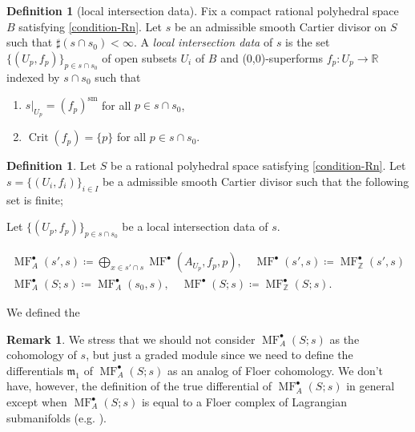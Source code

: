 \documentclass[a4paper,dvipdfmx,reqno,12pt]{amsart}
\theoremstyle{definition}
\newtheorem{definition}[theorem]{Definition}
\newtheorem{remark}[theorem]{Remark}
\newcommand{\deq}{\coloneqq}
\newcommand{\opn}[1]{\operatorname{#1}}
\numberwithin{equation}{section}
\begin{document}
\begin{definition}[{local intersection data}]
Fix a compact rational polyhedral space $B$ satisfying 
\cref{condition-Rn}.
Let $s$ be an admissible smooth Cartier divisor 
on $S$ such that $\sharp (s\cap s_0)<\infty$. 
A \emph{local intersection data} of $s$ is the set 
$\{(U_p,f_p)\}_{p\in s\cap s_0}$ of open subsets
$U_i$ of $B$ and (0,0)-superforms
$f_p\colon U_p \to \mathbb{R}$ indexed by 
$ s\cap s_0$ 
such that
\begin{enumerate}
\item $s|_{U_p}=(f_p)^{\mathrm{sm}}$
for all $p\in s\cap s_0$,
\item $\opn{Crit}(f_p)=\{p\}$ for all $p\in s\cap s_0$.
\end{enumerate}
\end{definition}


\begin{definition}
Let $S$ be a rational polyhedral space 
satisfying \cref{condition-Rn}.
Let $s=\{(U_i,f_i)\}_{i\in I}$ be a admissible smooth Cartier divisor such that
the following set is finite;


Let $\{(U_p,f_p)\}_{p\in s\cap s_0}$ 
be a local intersection data of $s$.

\begin{align}
\opn{MF}^{\bullet}_{A}(s',s)\deq 
\bigoplus_{x\in s' \cap s} 
\opn{MF}^{\bullet}(A_{U_p},f_{p},p), \quad 
\opn{MF}^{\bullet}(s',s)
\deq \opn{MF}^{\bullet}_{\mathbb{Z}}(s',s)\\
\opn{MF}^{\bullet}_A(S;s)
\deq \opn{MF}^{\bullet}_{A}(s_0,s), \quad
\opn{MF}^{\bullet}(S;s)\deq
\opn{MF}^{\bullet}_{\mathbb{Z}}(S;s).
\end{align}
\end{definition}

We defined the 

\begin{remark}
\label{remark-differential-graded-module}
We stress that we should not consider 
$\opn{MF}^{\bullet}_{A}(S;s)$ as the cohomology of $s$,
but just
a graded module 
since we need to define the differentials 
$\mathfrak{m}_1$ of 
$\opn{MF}^{\bullet}_{A}(S;s)$ as an analog of
Floer cohomology. We don't have, however,
the definition of the true differential of 
$\opn{MF}^{\bullet}_A(S;s)$ in general except when
$\opn{MF}^{\bullet}_{A}(S;s)$ is equal to a Floer complex
of Lagrangian submanifolds (e.g. \cite[5.2]{MR1882331}).
\end{remark}
\end{document}
